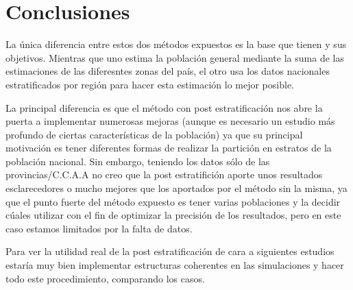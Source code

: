 \documentclass{article}
\begin{document}
\section{Conclusiones}

La única diferencia entre estos dos métodos expuestos es la base que tienen y sus objetivos. Mientras que uno estima la población general mediante la suma de las estimaciones de las diferesntes zonas del país, el otro usa los datos nacionales estratificados por región para hacer esta estimación lo mejor posible. 

La principal diferencia es que el método con post estratificación nos abre la puerta a implementar numerosas mejoras (aunque es necesario un estudio más profundo de ciertas características de la población) ya que su principal motivación es tener diferentes formas de realizar la partición en estratos de la población nacional. Sin embargo, teniendo los datos sólo de las provincias/C.C.A.A no creo que la post estratifición aporte unos resultados esclarecedores o mucho mejores que los aportados por el método sin la misma, ya que el punto fuerte del método expuesto es tener varias poblaciones y la decidir cúales utilizar con el fin de optimizar la precisión de los resultados, pero en este caso estamos limitados por la falta de datos. 


Para ver la utilidad real de la post estratificación de cara a siguientes estudios estaría muy bien implementar estructuras coherentes en las simulaciones y hacer todo este procedimiento, comparando los casos.
\end{document}
